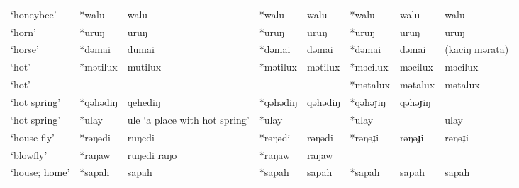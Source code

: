 \begin{landscape}
\begin{longtable}[c]{@{}p{3cm}<{\raggedright}p{2.75cm}<{\raggedright}p{2.75cm}<{\raggedright}p{2.75cm}<{\raggedright}p{2.75cm}<{\raggedright}p{2.75cm}<{\raggedright}p{2.75cm}<{\raggedright}p{2.75cm}<{\raggedright}@{}}
`honeybee'                                           & *walu              & walu                           & *walu              & walu                       & *walu            & walu                     & walu                              \\
`horn'                                               & *uruŋ              & uruŋ                           & *uruŋ              & uruŋ                       & *uruŋ            & uruŋ                     & uruŋ                              \\
`horse'                                              & *dəmai             & dumai                          & *dəmai             & dəmai                      & *dəmai           & dəmai                    & (kaciŋ mərata)                    \\
`hot'                                                & *mətilux           & mutilux                        & *mətilux           & mətilux                    & *məcilux         & məcilux                  & məcilux                           \\
`hot'                                                &                    &                                &                    &                            & *mətalux         & mətalux                  & mətalux                           \\
`hot spring'                                         & *qəhədiŋ           & qehediŋ                        & *qəhədiŋ           & qəhədiŋ                    & *qəhəɟiŋ         & qəhəɟiŋ                  &                                   \\
`hot spring'                                         & *ulay              & ule `a place with hot spring'  & *ulay              &                            & *ulay            &                          & ulay                              \\
`house fly'                                          & *rəŋədi            & ruŋedi                         & *rəŋədi            & rəŋədi                     & *rəŋəɟi          & rəŋəɟi                   & rəŋəɟi                            \\
`blowfly'                                            & *raŋaw             & ruŋedi raŋo                    & *raŋaw             & raŋaw                      &                  &                          &                                   \\
`house; home'                                        & *sapah             & sapah                          & *sapah             & sapah                      & *sapah           & sapah                    & sapah                             \\

\end{longtable}
\end{landscape}

